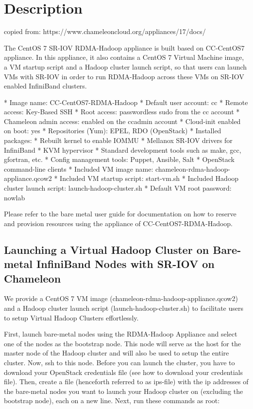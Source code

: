 \section{Description}

copied from: https://www.chameleoncloud.org/appliances/17/docs/

The CentOS 7 SR-IOV RDMA-Hadoop appliance is built based on CC-CentOS7
appliance. In this appliance, it also contains a CentOS 7 Virtual
Machine image, a VM startup script and a Hadoop cluster launch script,
so that users can launch VMs with SR-IOV in order to run RDMA-Hadoop
across these VMs on SR-IOV enabled InfiniBand clusters.

* Image name: CC-CentOS7-RDMA-Hadoop
* Default user account: cc
* Remote access: Key-Based SSH
* Root access: passwordless sudo from the cc account
* Chameleon admin access: enabled on the ccadmin account
* Cloud-init enabled on boot: yes
* Repositories (Yum): EPEL, RDO (OpenStack)
* Installed packages:
  * Rebuilt kernel to enable IOMMU
  * Mellanox SR-IOV drivers for InfiniBand
  * KVM hypervisor
  * Standard development tools such as make, gcc, gfortran, etc.
  * Config management tools: Puppet, Ansible, Salt
  * OpenStack command-line clients
* Included VM image name: chameleon-rdma-hadoop-appliance.qcow2
* Included VM startup script: start-vm.sh
* Included Hadoop cluster launch script: launch-hadoop-cluster.sh
* Default VM root password: nowlab


Please refer to the bare metal user guide for documentation on how to reserve and provision resources using the appliance of CC-CentOS7-RDMA-Hadoop.

\subsection{Launching a Virtual Hadoop Cluster on Bare-metal InfiniBand Nodes with SR-IOV on Chameleon}


We provide a CentOS 7 VM image (chameleon-rdma-hadoop-appliance.qcow2)
and a Hadoop cluster launch script (launch-hadoop-cluster.sh) to
facilitate users to setup Virtual Hadoop Clusters effortlessly.

First, launch bare-metal nodes using the RDMA-Hadoop Appliance and select one of the nodes as the bootstrap node. This node will serve as the host for the master node of the Hadoop cluster and will also be used to setup the entire cluster. Now, ssh to this node. Before you can launch the cluster, you have to download your OpenStack credentials file (see how to download your credentials file). Then, create a file (henceforth referred to as ips-file) with the ip addresses of the bare-metal nodes you want to launch your Hadoop cluster on (excluding the bootstrap node), each on a new line. Next, run these commands as root:

